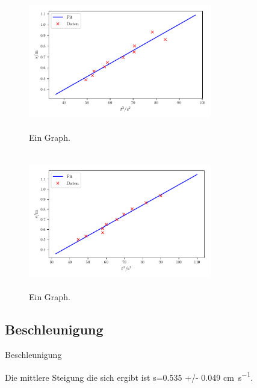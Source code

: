 \begin{frame}
    \begin{figure}   
    
    \centering
    \includegraphics[width=8cm, height=6cm]{build/plot2b.pdf}
    \caption{Ein Graph.} 

    \label{fig:plot2b}
\end{figure}
\end{frame}

\begin{frame}
    \begin{figure}   
    
    \centering
    \includegraphics[width=8cm, height=6cm]{build/plot3b.pdf}
    \caption{Ein Graph.} 

    \label{fig:plot3b}
\end{figure}
\end{frame}

\subsection{Beschleunigung}
\begin{frame}
    \begin{block}{Beschleunigung}
        
        Die mittlere Steigung die sich ergibt ist s=0.535 +/- 0.049 \si{\centi\meter\per\second}.
    \end{block}
\end{frame}
    

